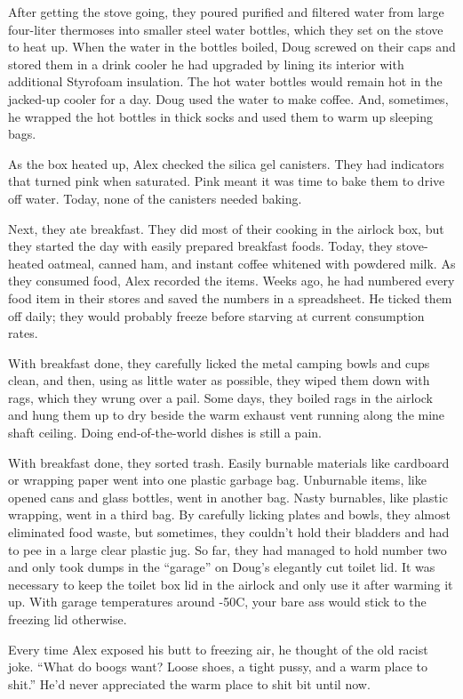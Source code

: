 After getting the stove going, they poured purified and filtered water
from large four-liter thermoses into smaller steel water bottles, which
they set on the stove to heat up. When the water in the bottles boiled,
Doug screwed on their caps and stored them in a drink cooler he had
upgraded by lining its interior with additional Styrofoam insulation.
The hot water bottles would remain hot in the jacked-up cooler for a
day. Doug used the water to make coffee. And, sometimes, he wrapped the
hot bottles in thick socks and used them to warm up sleeping bags.

As the box heated up, Alex checked the silica gel canisters. They had
indicators that turned pink when saturated. Pink meant it was time to
bake them to drive off water. Today, none of the canisters needed
baking.

Next, they ate breakfast. They did most of their cooking in the airlock
box, but they started the day with easily prepared breakfast foods.
Today, they stove-heated oatmeal, canned ham, and instant coffee
whitened with powdered milk. As they consumed food, Alex recorded the
items. Weeks ago, he had numbered every food item in their stores and
saved the numbers in a spreadsheet. He ticked them off daily; they would
probably freeze before starving at current consumption rates.

With breakfast done, they carefully licked the metal camping bowls and
cups clean, and then, using as little water as possible, they wiped them
down with rags, which they wrung over a pail. Some days, they boiled
rags in the airlock and hung them up to dry beside the warm exhaust vent
running along the mine shaft ceiling. Doing end-of-the-world dishes is
still a pain.

With breakfast done, they sorted trash. Easily burnable materials like
cardboard or wrapping paper went into one plastic garbage bag.
Unburnable items, like opened cans and glass bottles, went in another
bag. Nasty burnables, like plastic wrapping, went in a third bag. By
carefully licking plates and bowls, they almost eliminated food waste,
but sometimes, they couldn't hold their bladders and had to pee in a
large clear plastic jug. So far, they had managed to hold number two and
only took dumps in the ``garage'' on Doug's elegantly cut toilet lid. It
was necessary to keep the toilet box lid in the airlock and only use it
after warming it up. With garage temperatures around -50C, your bare ass
would stick to the freezing lid otherwise.

Every time Alex exposed his butt to freezing air, he thought of the old
racist joke. ``What do boogs want? Loose shoes, a tight pussy, and a
warm place to shit.'' He'd never appreciated the warm place to shit bit
until now.

